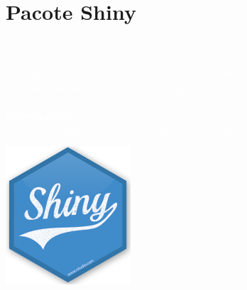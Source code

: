 \documentclass[12pt,ignorenonframetext,aspectratio=1610]{beamer}
\begin{document}

\section{Pacote Shiny}

\begin{frame}[c]{}
	
	\begin{center}

		 \\~\\
	
	\hspace{5cm}\textcolor{white}{Biblioteca que facilita a criação de aplicativos da Web} \\ \hspace{4cm}\textcolor{white}{interativos usando diretamente a Linguagem R.} \\~\\
		
	\textcolor{white}{\textbf{Shinyapps.io:} \\ Servidor gratuito para hospedar os aplicativos Shiny.}
	
	\begin{center}
		\includegraphics[scale=0.45]{Fig/shiny.png}
	\end{center}
	
	\end{center}
	
\end{frame}
\end{document}
